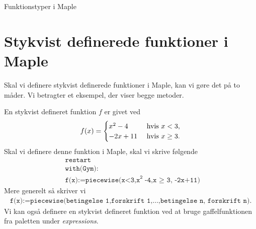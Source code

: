 \begin{center}
\Huge
Funktionstyper i Maple
\end{center}

\section*{Stykvist definerede funktioner i Maple}

Skal vi definere stykvist definerede funktioner i Maple, kan vi gøre det på to måder. Vi betragter et eksempel, der viser begge metoder.
\begin{exa}
	En stykvist defineret funktion $f$ er givet ved
	\begin{align*}
		f(x) = 
		\begin{cases}
			x^2 - 4 \ &\textnormal{hvis }x < 3,\\
			-2x + 11 \ &\textnormal{hvis }x \geq 3.
		\end{cases}
	\end{align*}
	Skal vi definere denne funktion i Maple, skal vi skrive følgende
	\begin{align*}
		&\texttt{restart}\\
		&\texttt{with(Gym):}\\
		&\texttt{f(x):=piecewise(x<3,x}^\texttt{2}\texttt{-4,x $\geq$ 3, -2x+11)}
	\end{align*}
	Mere generelt så skriver vi
	\begin{align*}
		\texttt{f(x):=piecewise(betingelse 1,forskrift 1,$\hdots$,betingelse n, forskrift n)}.
	\end{align*}
	Vi kan også definere en stykvist defineret funktion ved at bruge gaffelfunktionen fra paletten under \textit{expressions}.


\end{exa}
